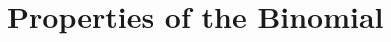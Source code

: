 \documentclass{article}
\begin{document}
    
    
    

\section{Properties of the Binomial}
\end{document}
